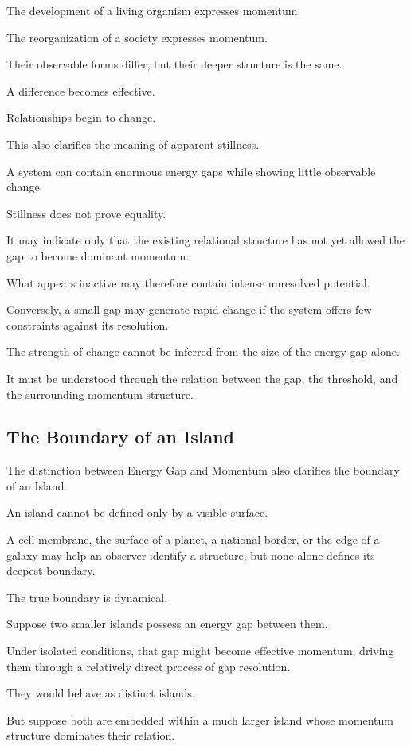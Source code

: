 The development of a living organism expresses momentum.

The reorganization of a society expresses momentum.

Their observable forms differ, but their deeper structure is the same.

A difference becomes effective.

Relationships begin to change.

This also clarifies the meaning of apparent stillness.

A system can contain enormous energy gaps while showing little observable change.

Stillness does not prove equality.

It may indicate only that the existing relational structure has not yet allowed the gap to become dominant momentum.

What appears inactive may therefore contain intense unresolved potential.

Conversely, a small gap may generate rapid change if the system offers few constraints against its resolution.

The strength of change cannot be inferred from the size of the energy gap alone.

It must be understood through the relation between the gap, the threshold, and the surrounding momentum structure.

\subsection*{\textbf{The Boundary of an Island}}

The distinction between Energy Gap and Momentum also clarifies the boundary of an Island.

An island cannot be defined only by a visible surface.

A cell membrane, the surface of a planet, a national border, or the edge of a galaxy may help an observer identify a structure, but none alone defines its deepest boundary.

The true boundary is dynamical.

Suppose two smaller islands possess an energy gap between them.

Under isolated conditions, that gap might become effective momentum, driving them through a relatively direct process of gap resolution.

They would behave as distinct islands.

But suppose both are embedded within a much larger island whose momentum structure dominates their relation.

